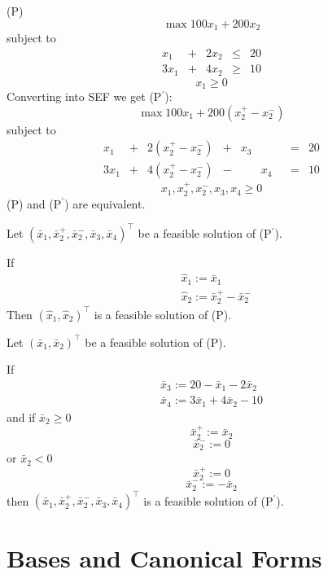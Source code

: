 \begin{exbox}
    \begin{example}
        (P)
        \[\max 100x_1+200x_2\]
        subject to
        \[
            \begin{array}{ccccc}
                x_1  & + & 2x_2 & \leqslant & 20 \\
                3x_1 & + & 4x_2 & \geqslant & 10
            \end{array}
        \]
        \[x_1 \geqslant  0\]
        Converting into SEF we get (P$^\prime$):
        \[\max 100x_1+200(x_2^+-x_2^-)\]
        subject to
        \[
            \begin{array}{ccccccccc}
                x_1  & + & 2(x_2^+-x_2^-) & + & x_3 &     &  & = & 20 \\
                3x_1 & + & 4(x_2^+-x_2^-) & - &     & x_4 &  & = & 10
            \end{array}
        \]
        \[x_1,x_2^+,x_2^-,x_3,x_4\geqslant  0\]
        (P) and (P$^\prime$) are equivalent.

        Let
        $(\bar{x}_1, \bar{x}_2^+, \bar{x}_2^-, \bar{x}_3, \bar{x}_4)^\top$
        be a feasible solution of (P$^\prime$).


        If
        \begin{align*}
             & \hat{x}_1:=\bar{x}_1               \\
             & \hat{x}_2:=\bar{x}_2^+-\bar{x}_2^-
        \end{align*}
        Then
        $(\hat{x}_1,\hat{x}_2)^\top$
        is a feasible solution of (P).

        Let
        $(\bar{x}_1, \bar{x}_2)^\top$
        be a feasible solution of (P).

        If
        \begin{align*}
            \bar{x}_3:=20-\bar{x}_1-2\bar{x}_2 \\
            \bar{x}_4:=3\bar{x}_1+4\bar{x}_2-10
        \end{align*}
        and
        if $\bar{x}_2\geqslant  0$
        \[\bar{x}_2^+:=\bar{x}_2\]
        \[\bar{x}_2^-:=0\]
        or $\bar{x}_2< 0$
        \[\bar{x}_2^+:=0\]
        \[\bar{x}_2^-:=-\bar{x}_2\]
        then $(\bar{x}_1,\bar{x}_2^+,\bar{x}_2^-,\bar{x}_3,\bar{x}_4)^\top$
        is a feasible solution of (P$^\prime$).
    \end{example}
\end{exbox}

\section{Bases and Canonical Forms}
